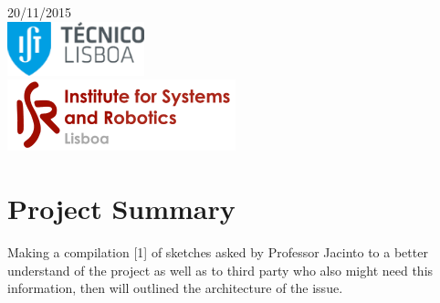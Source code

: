 \begin{titlepage}


{\large 20/11/2015}\\[2cm] %


\includegraphics{ist-logo.png}\\[0.5cm] %

\includegraphics{isr-logo.png}\\[0.5cm] %
 

\vfill %

\end{titlepage}

\section{Project Summary}

Making a compilation [1] of sketches asked by Professor Jacinto to a better understand of the project as well as to third party who also might need this information, then will outlined the architecture of the issue.

